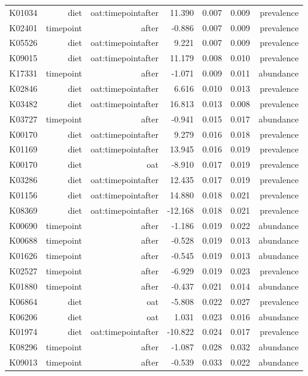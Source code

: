 \documentclass[
]{article}
\begin{document}
\begin{longtable}[t]{lrrrrrr}
\addlinespace
K01034 & diet & oat:timepointafter & 11.390 & 0.007 & 0.009 & prevalence\\
K02401 & timepoint & after & -0.886 & 0.007 & 0.009 & prevalence\\
K05526 & diet & oat:timepointafter & 9.221 & 0.007 & 0.009 & prevalence\\
K09015 & diet & oat:timepointafter & 11.179 & 0.008 & 0.010 & prevalence\\
K17331 & timepoint & after & -1.071 & 0.009 & 0.011 & abundance\\
\addlinespace
K02846 & diet & oat:timepointafter & 6.616 & 0.010 & 0.013 & prevalence\\
K03482 & diet & oat:timepointafter & 16.813 & 0.013 & 0.008 & prevalence\\
K03727 & timepoint & after & -0.941 & 0.015 & 0.017 & abundance\\
K00170 & diet & oat:timepointafter & 9.279 & 0.016 & 0.018 & prevalence\\
K01169 & diet & oat:timepointafter & 13.945 & 0.016 & 0.019 & prevalence\\
\addlinespace
K00170 & diet & oat & -8.910 & 0.017 & 0.019 & prevalence\\
K03286 & diet & oat:timepointafter & 12.435 & 0.017 & 0.019 & prevalence\\
K01156 & diet & oat:timepointafter & 14.880 & 0.018 & 0.021 & prevalence\\
K08369 & diet & oat:timepointafter & -12.168 & 0.018 & 0.021 & prevalence\\
K00690 & timepoint & after & -1.186 & 0.019 & 0.022 & abundance\\
\addlinespace
K00688 & timepoint & after & -0.528 & 0.019 & 0.013 & abundance\\
K01626 & timepoint & after & -0.545 & 0.019 & 0.013 & abundance\\
K02527 & timepoint & after & -6.929 & 0.019 & 0.023 & prevalence\\
K01880 & timepoint & after & -0.437 & 0.021 & 0.014 & abundance\\
K06864 & diet & oat & -5.808 & 0.022 & 0.027 & prevalence\\
\addlinespace
K06206 & diet & oat & 1.031 & 0.023 & 0.016 & abundance\\
K01974 & diet & oat:timepointafter & -10.822 & 0.024 & 0.017 & prevalence\\
K08296 & timepoint & after & -1.087 & 0.028 & 0.032 & abundance\\
K09013 & timepoint & after & -0.539 & 0.033 & 0.022 & abundance\\

\end{longtable}
\end{document}
